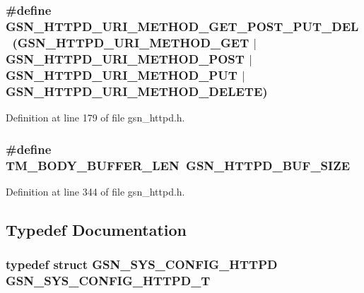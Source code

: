 \hypertarget{a00508_a06d9ae66ee299f4e7a7100d841ae1f63}{
\subsubsection[{GSN\_\-HTTPD\_\-URI\_\-METHOD\_\-GET\_\-POST\_\-PUT\_\-DEL}]{\setlength{\rightskip}{0pt plus 5cm}\#define GSN\_\-HTTPD\_\-URI\_\-METHOD\_\-GET\_\-POST\_\-PUT\_\-DEL~(GSN\_\-HTTPD\_\-URI\_\-METHOD\_\-GET $|$ GSN\_\-HTTPD\_\-URI\_\-METHOD\_\-POST $|$ GSN\_\-HTTPD\_\-URI\_\-METHOD\_\-PUT $|$ GSN\_\-HTTPD\_\-URI\_\-METHOD\_\-DELETE)}}
\label{a00508_a06d9ae66ee299f4e7a7100d841ae1f63}


Definition at line 179 of file gsn\_\-httpd.h.

\hypertarget{a00508_a7a853f860dc83c4b0b428b7c1a383eff}{
\subsubsection[{TM\_\-BODY\_\-BUFFER\_\-LEN}]{\setlength{\rightskip}{0pt plus 5cm}\#define TM\_\-BODY\_\-BUFFER\_\-LEN~GSN\_\-HTTPD\_\-BUF\_\-SIZE}}
\label{a00508_a7a853f860dc83c4b0b428b7c1a383eff}


Definition at line 344 of file gsn\_\-httpd.h.



\subsection{Typedef Documentation}
\hypertarget{a00508_a99fe9448f197945df42731f9f0a5e7e3}{
\subsubsection[{GSN\_\-SYS\_\-CONFIG\_\-HTTPD\_\-T}]{\setlength{\rightskip}{0pt plus 5cm}typedef struct {\bf GSN\_\-SYS\_\-CONFIG\_\-HTTPD}  {\bf GSN\_\-SYS\_\-CONFIG\_\-HTTPD\_\-T}}}
\label{a00508_a99fe9448f197945df42731f9f0a5e7e3}


